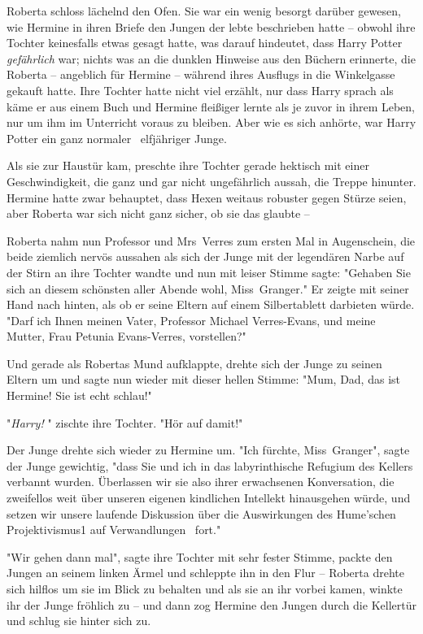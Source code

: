 {Roberta schloss lächelnd den Ofen. Sie war ein wenig besorgt darüber gewesen, wie Hermine in ihren Briefe den Jungen der lebte beschrieben hatte -- obwohl ihre Tochter keinesfalls etwas gesagt hatte, was darauf hindeutet, dass Harry Potter \emph{gefährlich} war; nichts was an die dunklen Hinweise aus den Büchern erinnerte, die Roberta -- angeblich für Hermine -- während ihres Ausflugs in die Winkelgasse gekauft hatte. Ihre Tochter hatte nicht viel erzählt, nur dass Harry sprach als käme er aus einem Buch und Hermine fleißiger lernte als je zuvor in ihrem Leben, nur um ihm im Unterricht voraus zu bleiben. Aber wie es sich anhörte, war Harry Potter ein ganz normaler ~elfjähriger Junge.

Als sie zur Haustür kam, preschte ihre Tochter gerade hektisch mit einer Geschwindigkeit, die ganz und gar nicht ungefährlich aussah, die Treppe hinunter. Hermine hatte zwar behauptet, dass Hexen weitaus robuster gegen Stürze seien, aber Roberta war sich nicht ganz sicher, ob sie das glaubte --

Roberta nahm nun Professor und Mrs~Verres zum ersten Mal in Augenschein, die beide ziemlich nervös aussahen als sich der Junge mit der legendären Narbe auf der Stirn an ihre Tochter wandte und nun mit leiser Stimme sagte: "Gehaben Sie sich an diesem schönsten aller Abende wohl, Miss~Granger." Er zeigte mit seiner Hand nach hinten, als ob er seine Eltern auf einem Silbertablett darbieten würde. "Darf ich Ihnen meinen Vater, Professor Michael Verres-Evans, und meine Mutter, Frau Petunia Evans-Verres, vorstellen?"

Und gerade als Robertas Mund aufklappte, drehte sich der Junge zu seinen Eltern um und sagte nun wieder mit dieser hellen Stimme: "Mum, Dad, das ist Hermine! Sie ist echt schlau!"

"\emph{Harry!} " zischte ihre Tochter. "Hör auf damit!"

Der Junge drehte sich wieder zu Hermine um. "Ich fürchte, Miss~Granger", sagte der Junge gewichtig, "dass Sie und ich in das labyrinthische Refugium des Kellers verbannt wurden. Überlassen wir sie also ihrer erwachsenen Konversation, die zweifellos weit über unseren eigenen kindlichen Intellekt hinausgehen würde, und setzen wir unsere laufende Diskussion über die Auswirkungen des Hume'schen Projektivismus1 auf Verwandlungen ~fort."

"Wir gehen dann mal", sagte ihre Tochter mit sehr fester Stimme, packte den Jungen an seinem linken Ärmel und schleppte ihn in den Flur -- Roberta drehte sich hilflos um sie im Blick zu behalten und als sie an ihr vorbei kamen, winkte ihr der Junge fröhlich zu -- und dann zog Hermine den Jungen durch die Kellertür und schlug sie hinter sich zu.

}

